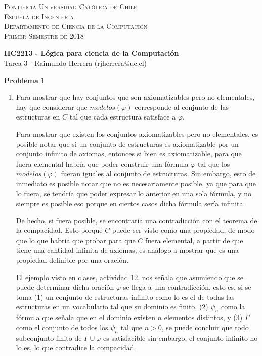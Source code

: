 \documentclass[letterpaper,10pt]{article}
\begin{document}
\small
\textsc{Pontificia Universidad Católica de Chile}\\
\textsc{Escuela de Ingeniería}\\
\textsc{Departamento de Ciencia de la Computación}\\
\textsc{Primer Semestre de 2018}

\large
\begin{center}
\textbf{IIC2213 - Lógica para ciencia de la Computación}\\
Tarea 3 - Raimundo Herrera (rjherrera@uc.cl)
\end{center}

\normalsize
\textbf{Problema 1}


\begin{enumerate}
    \item Para mostrar que hay conjuntos que son axiomatizables pero no elementales, hay que considerar que $modelos(\varphi)$ corresponde al conjunto de las estructuras en $C$ tal que cada estructura satisface a $\varphi$.

    Para mostrar que existen los conjuntos axiomatizables pero no elementales, es posible notar que si un conjunto de estructuras es axiomatizable por un conjunto infinito de axiomas, entonces si bien es axiomatizable, para que fuera elemental habría que poder construir una fórmula $\varphi$ tal que los $modelos(\varphi)$ fueran iguales al conjunto de estructuras. Sin embargo, esto de inmediato es posible notar que no es necesariamente posible, ya que para que lo fuera, se tendría que poder expresar lo anterior en una sola fórmula, y no siempre es posible eso porque en ciertos casos dicha fórmula sería infinita.

    De hecho, si fuera posible, se encontraría una contradicción con el teorema de la compacidad. Esto porque $C$ puede ser visto como una propiedad, de modo que lo que habría que probar para que $C$ fuera elemental, a partir de que tiene una cantidad infinita de axiomas, es análogo a mostrar que es una propiedad definible por una oración.

    El ejemplo visto en clases, actividad 12, nos señala que asumiendo que se puede determinar dicha oración $\varphi$ se llega a una contradicción, esto es, si se toma (1) un conjunto de estructuras infinito como lo es el de todas las estructuras en un vocabulario tal que su dominio es finito, (2) $\psi_n$ como la fórmula que señala que en el dominio existen $n$ elementos distintos, y (3) $\Gamma$ como el conjunto de todos los $\psi_n$ tal que $n > 0$, se puede concluir que todo subconjunto finito de $\Gamma \cup \varphi$ es satisfacible sin embargo, el conjunto infinito no lo es, lo que contradice la compacidad.


\end{enumerate}
\end{document}
